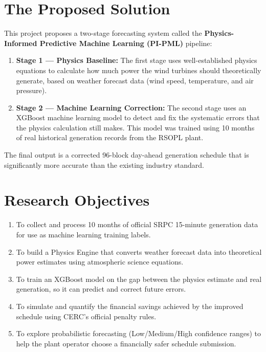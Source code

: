 \documentclass[12pt,a4paper]{report}
\begin{document}
\section{The Proposed Solution}

This project proposes a two-stage forecasting system called the \textbf{Physics-Informed Predictive Machine Learning (PI-PML)} pipeline:

\begin{enumerate}
    \item \textbf{Stage 1 — Physics Baseline:} The first stage uses well-established physics equations to calculate how much power the wind turbines should theoretically generate, based on weather forecast data (wind speed, temperature, and air pressure).
    \item \textbf{Stage 2 — Machine Learning Correction:} The second stage uses an XGBoost machine learning model to detect and fix the systematic errors that the physics calculation still makes. This model was trained using 10 months of real historical generation records from the RSOPL plant.
\end{enumerate}

The final output is a corrected 96-block day-ahead generation schedule that is significantly more accurate than the existing industry standard.

\section{Research Objectives}

\begin{enumerate}
    \item To collect and process 10 months of official SRPC 15-minute generation data for use as machine learning training labels.
    \item To build a Physics Engine that converts weather forecast data into theoretical power estimates using atmospheric science equations.
    \item To train an XGBoost model on the gap between the physics estimate and real generation, so it can predict and correct future errors.
    \item To simulate and quantify the financial savings achieved by the improved schedule using CERC's official penalty rules.
    \item To explore probabilistic forecasting (Low/Medium/High confidence ranges) to help the plant operator choose a financially safer schedule submission.
\end{enumerate}
\end{document}
